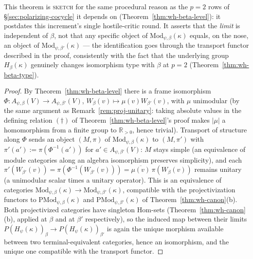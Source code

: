 \begin{scope}
This theorem is \textsc{sketch} for the same procedural reason as the
$p=2$ rows of \S\ref{sec:polarizing-cocycle} it depends on
(Theorem~\ref{thm:wh-beta-level}): it postdates this increment's single
hostile-critic round. It asserts that the \emph{limit} is independent of
$\beta$, not that any specific object of $\mathrm{Mod}_{\psi,\beta}(\kappa)$
equals, on the nose, an object of $\mathrm{Mod}_{\psi,\beta'}(\kappa)$ — the
identification goes through the transport functor described in the proof,
consistently with the fact that the underlying group $H_\beta(\kappa)$
genuinely changes isomorphism type with $\beta$ at $p=2$
(Theorem~\ref{thm:wh-beta-type}).
\end{scope}


\begin{proof}
By Theorem~\ref{thm:wh-beta-level} there is a frame isomorphism
$\Phi : A_{\psi,\beta}(V)\to A_{\psi,\beta'}(V)$, $W_\beta(v)\mapsto\mu(v)W_{\beta'}(v)$,
with $\mu$ unimodular (by the same argument as
Remark~\ref{rem:proj-unitary}: taking absolute values in the defining
relation $(\dagger)$ of Theorem~\ref{thm:wh-beta-level}'s proof makes
$|\mu|$ a homomorphism from a finite group to $\mathbb{R}_{>0}$, hence
trivial). Transport of structure along $\Phi$ sends an object $(M,\pi)$ of
$\mathrm{Mod}_{\psi,\beta}(\kappa)$ to $(M,\pi')$ with
$\pi'(a'):=\pi(\Phi^{-1}(a'))$ for $a'\in A_{\psi,\beta'}(V)$: $M$ stays
simple (an equivalence of module categories along an algebra isomorphism
preserves simplicity), and each $\pi'(W_{\beta'}(v))=\pi(\Phi^{-1}(W_{\beta'}(v)))=\overline{\mu(v)}\,\pi(W_\beta(v))$
remains unitary (a unimodular scalar times a unitary operator). This is an
equivalence of categories
$\mathrm{Mod}_{\psi,\beta}(\kappa)\to\mathrm{Mod}_{\psi,\beta'}(\kappa)$,
compatible with the projectivization functors to
$\mathrm{PMod}_{\psi,\beta}(\kappa)$ and $\mathrm{PMod}_{\psi,\beta'}(\kappa)$
of Theorem~\ref{thm:wh-canon}(b). Both projectivized categories have
singleton $\mathrm{Hom}$-sets (Theorem~\ref{thm:wh-canon}(b), applied at
$\beta$ and at $\beta'$ respectively), so the induced map between their
limits $P(H_\psi(\kappa))_\beta \to P(H_\psi(\kappa))_{\beta'}$ is again the
unique morphism available between two terminal-equivalent categories, hence
an isomorphism, and the unique one compatible with the transport functor.
\end{proof}
